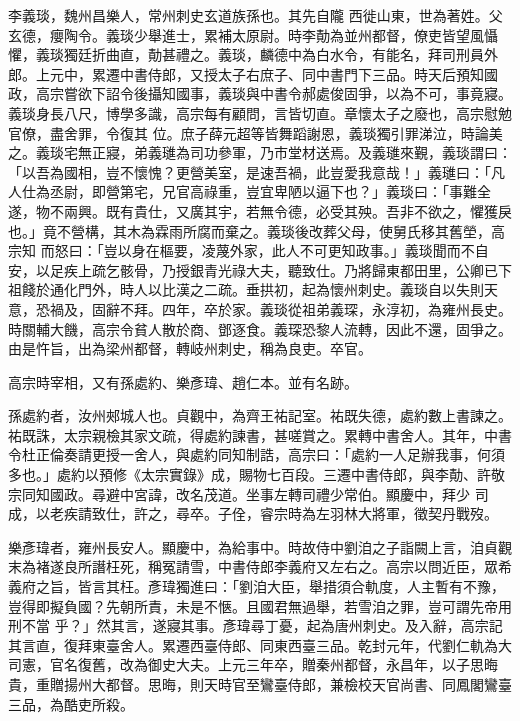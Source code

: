 \begin{pinyinscope}
 李義琰，魏州昌樂人，常州刺史玄道族孫也。其先自隴
 西徙山東，世為著姓。父玄德，癭陶令。義琰少舉進士，累補太原尉。時李勣為並州都督，僚吏皆望風懾懼，義琰獨廷折曲直，勣甚禮之。義琰，麟德中為白水令，有能名，拜司刑員外郎。上元中，累遷中書侍郎，又授太子右庶子、同中書門下三品。時天后預知國政，高宗嘗欲下詔令後攝知國事，義琰與中書令郝處俊固爭，以為不可，事竟寢。義琰身長八尺，博學多識，高宗每有顧問，言皆切直。章懷太子之廢也，高宗慰勉官僚，盡舍罪，令復其
 位。庶子薛元超等皆舞蹈謝恩，義琰獨引罪涕泣，時論美之。義琰宅無正寢，弟義璡為司功參軍，乃市堂材送焉。及義璡來覲，義琰謂曰：「以吾為國相，豈不懷愧？更營美室，是速吾禍，此豈愛我意哉！」義璡曰：「凡人仕為丞尉，即營第宅，兄官高祿重，豈宜卑陋以逼下也？」義琰曰：「事難全遂，物不兩興。既有貴仕，又廣其宇，若無令德，必受其殃。吾非不欲之，懼獲戾也。」竟不營構，其木為霖雨所腐而棄之。義琰後改葬父母，使舅氏移其舊塋，高宗知
 而怒曰：「豈以身在樞要，凌蔑外家，此人不可更知政事。」義琰聞而不自安，以足疾上疏乞骸骨，乃授銀青光祿大夫，聽致仕。乃將歸東都田里，公卿已下祖餞於通化門外，時人以比漢之二疏。垂拱初，起為懷州刺史。義琰自以失則天意，恐禍及，固辭不拜。四年，卒於家。義琰從祖弟義琛，永淳初，為雍州長史。時關輔大饑，高宗令貧人散於商、鄧逐食。義琛恐黎人流轉，因此不還，固爭之。由是忤旨，出為梁州都督，轉岐州刺史，稱為良吏。卒官。



 高宗時宰相，又有孫處約、樂彥瑋、趙仁本。並有名跡。



 孫處約者，汝州郟城人也。貞觀中，為齊王祐記室。祐既失德，處約數上書諫之。祐既誅，太宗親檢其家文疏，得處約諫書，甚嗟賞之。累轉中書舍人。其年，中書令杜正倫奏請更授一舍人，與處約同知制誥，高宗曰：「處約一人足辦我事，何須多也。」處約以預修《太宗實錄》成，賜物七百段。三遷中書侍郎，與李勣、許敬宗同知國政。尋避中宮諱，改名茂道。坐事左轉司禮少常伯。顯慶中，拜少
 司成，以老疾請致仕，許之，尋卒。子佺，睿宗時為左羽林大將軍，徵契丹戰歿。



 樂彥瑋者，雍州長安人。顯慶中，為給事中。時故侍中劉洎之子詣闕上言，洎貞觀末為褚遂良所譖枉死，稱冤請雪，中書侍郎李義府又左右之。高宗以問近臣，眾希義府之旨，皆言其枉。彥瑋獨進曰：「劉洎大臣，舉措須合軌度，人主暫有不豫，豈得即擬負國？先朝所責，未是不愜。且國君無過舉，若雪洎之罪，豈可謂先帝用刑不當
 乎？」然其言，遂寢其事。彥瑋尋丁憂，起為唐州刺史。及入辭，高宗記其言直，復拜東臺舍人。累遷西臺侍郎、同東西臺三品。乾封元年，代劉仁軌為大司憲，官名復舊，改為御史大夫。上元三年卒，贈秦州都督，永昌年，以子思晦貴，重贈揚州大都督。思晦，則天時官至鸞臺侍郎，兼檢校天官尚書、同鳳閣鸞臺三品，為酷吏所殺。




\end{pinyinscope}
